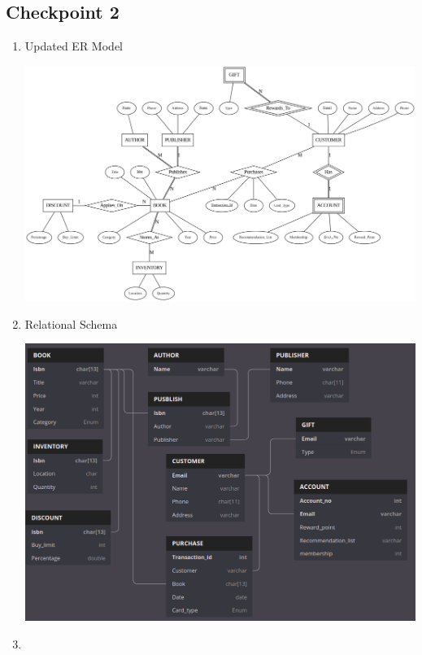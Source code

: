 \documentclass[12pt, letterpaper]{report}
\begin{document}
\subsection{Checkpoint 2}

\begin{enumerate}
\item Updated ER Model
  \begin{center}
    \includegraphics[width=\linewidth]{Section3/ER2.png}
  \end{center}

\item Relational Schema
  \begin{center}
    \includegraphics[width=\linewidth]{Section3/RS2.png}
  \end{center}

\item
  \begin{enumerate}


\end{enumerate}
\end{enumerate}
\end{document}
